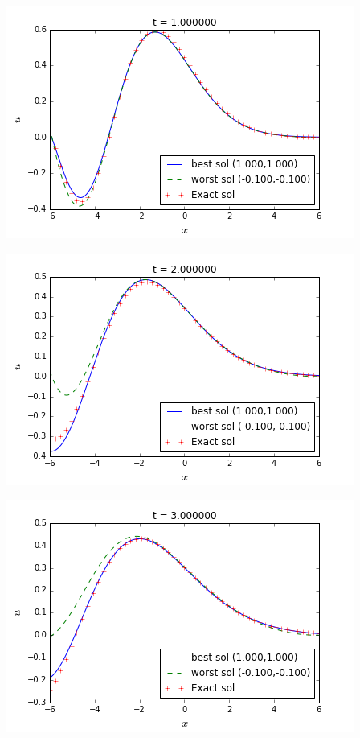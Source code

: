 \begingroup
\noindent
\begin{minipage}[t]{.5\linewidth}
\includegraphics[scale=.5]{figures/FinalFigures/BessefirstTestsP0CorrectSnap1.png}
\end{minipage}
\hfill
\begin{minipage}[t]{.5\linewidth}
	\includegraphics[scale=.5]{figures/FinalFigures/BessefirstTestsP0CorrectSnap2.png}
\end{minipage}
\begin{minipage}[t]{.5\linewidth}
\includegraphics[scale=.5]{figures/FinalFigures/BessefirstTestsP0CorrectSnap3.png}
\end{minipage}
